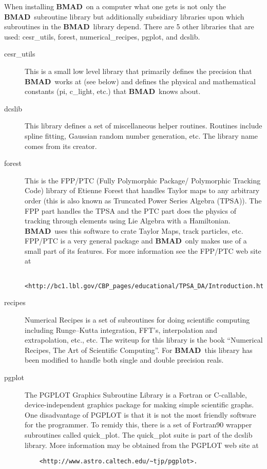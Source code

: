 \documentclass{book}
\newcommand{\bmad}{{\bf BMAD}}
\begin{document}
When installing \bmad\ on a computer what one gets is not only the \bmad\
subroutine library but additionally subsidiary libraries upon which
subroutines in the \bmad\ library depend. There are 5 other libraries
that are used: cesr\_utils, forest, numerical\_recipes, pgplot, and dcslib.
\begin{description}
\item[cesr\_utils] This is a small low level library that primarily defines 
the precision that \bmad\ works at (see below) and defines the physical
and mathematical constants (pi, c\_light, etc.) that \bmad\ knows
about.
\item[dcslib] This library defines a set of miscellaneous helper routines. 
Routines include spline fitting, Gaussian random number generation,
etc. The library name comes from its creator.
\item[forest] This is the FPP/PTC 
(Fully Polymorphic Package/ Polymorphic Tracking Code) library of
Etienne Forest that handles Taylor maps to any arbitrary order (this
is also known as Truncated Power Series Algebra (TPSA)). The FPP part
handles the TPSA and the PTC part does the physics of tracking through
elements using Lie Algebra with a Hamiltonian.  \bmad\ uses this
software to crate Taylor Maps, track particles, etc.  FPP/PTC is a
very general package and \bmad\ only makes use of a small part of its
features. For more information see the FPP/PTC web site at
\begin{verbatim} 
    <http://bc1.lbl.gov/CBP_pages/educational/TPSA_DA/Introduction.html>
\end{verbatim}
\item[recipes] Numerical Recipes is a set of subroutines for doing 
scientific computing including Runge--Kutta integration, FFT's,
interpolation and extrapolation, etc., etc. The writeup for this
library is the book ``Numerical Recipes, The Art of Scientific
Computing''\cite{?}. For \bmad\ this library has been modified to handle
both single and double precision reals.
\item[pgplot] The PGPLOT Graphics Subroutine Library is a Fortran or 
C-callable, device-independent graphics package for making simple
scientific graphs.  One
disadvantage of PGPLOT is that it is not the most friendly software
for the programmer. To remidy this, there is a set of Fortran90
wrapper subroutines called quick\_plot. The quick\_plot suite is part
of the dcslib library. More information may be obtained from the PGPLOT
web site at 
\begin{verbatim}
    <http://www.astro.caltech.edu/~tjp/pgplot>.
\end{verbatim}

\end{description}
\end{document}
